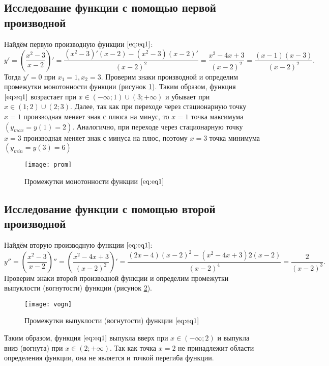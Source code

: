 \subsection{Исследование функции с помощью первой производной}
Найдём первую производную функции $\eqref{eq:eq1}$:
\[y' = \left(\frac{x^2-3}{x-2}\right)' = \frac{(x^2-3)'(x-2)-(x^2-3)(x-2)'}{(x-2)^2}  = \frac{x^2-4x+3}{(x-2)^2} = \frac{(x-1)(x-3)}{(x-2)^2}.\]
Тогда $y' = 0$ при $x_1 = 1, x_2 = 3$.
Проверим знаки производной и определим промежутки монотонности функции (рисунок \ref{pic:prom}). Таким образом, функция $\eqref{eq:eq1}$ возрастает при $x \in (-\infty;1) \cup (3; +\infty)$ и убывает при $x \in (1;2) \cup (2;3)$. Далее, так как при переходе через стационарную точку $x = 1$ производная меняет знак с плюса на минус, то $x=1$ точка максимума $(y_{max} = y(1) = 2)$. Аналогично, при переходе через стационарную точку
$x = 3$ производная меняет знак с минуса на плюс, поэтому $x = 3$ точка минимума $(y_{min} = y(3) = 6)$
\begin{figure}[H]
	\begin{center}
		\texttt{[image: prom]}
		\caption{Промежутки монотонности функции $\eqref{eq:eq1}$}
		\label{pic:prom}
	\end{center}
\end{figure}
\subsection{Исследование функции с помощью второй производной}
Найдём вторую производную функции $\eqref{eq:eq1}$:
\[y'' = \left(\frac{x^2-3}{x-2}\right)'' = \left(\frac{x^2-4x+3}{(x-2)^2}\right)' = \frac{(2x-4)(x-2)^2 - (x^2-4x+3)2(x-2)}{(x-2)^4} = \frac{2}{(x-2)^3}.\]
Проверим знаки второй производной функции и определим промежутки выпуклости (вогнутости) функции (рисунок \ref{pic:vogn}).
\begin{figure}[H]
	\begin{center}
		\texttt{[image: vogn]}
		\caption{Промежутки выпуклости (вогнутости) функции $\eqref{eq:eq1}$}
		\label{pic:vogn}
	\end{center}
\end{figure}
Таким образом, функция $\eqref{eq:eq1}$ выпукла вверх при $x \in (-\infty; 2)$ и выпукла вниз (вогнута) при $x \in (2; +\infty)$. Так как точка $x = 2$ не принадлежит области определения функции, она не является и точкой перегиба функции.
